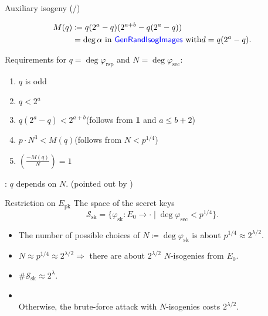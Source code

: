 \begin{frame}{Auxiliary isogeny (/\auxRIItotal{})}

    \vspace{-10pt}
    \begin{align*}
        M(q) &\coloneqq q(2^a - q)(2^{a + b} - q(2^a - q))\\
            &= \deg\alpha \text{ in \textcolor{blue}{\textsf{GenRandIsogImages}} with} d = q(2^a - q).
    \end{align*}

    \mypause
    \vspace{10pt}
    Requirements for $q = \deg\varphi_\mathrm{rsp}$ and $N = \deg\varphi_\mathrm{sec}$:
    \begin{enumerate}
        \item $q$ is odd
        \item $q < 2^a$
        \item $q(2^a - q) < 2^{a + b}$\quad (follows from \textbf{1} and $a \leq b + 2$)
        \item $p \cdot N^3 < M(q)$\qquad (follows from $N < p^{1/4}$)
        \item $\left(\frac{-M(q)}{N}\right) = 1$
    \end{enumerate}

    \vspace{10pt}
     : $q$ depends on $N$.\quad
    (pointed out by \cite{CCILV2024sqisign2d_attack})
\end{frame}

\begin{frame}{Restriction on $E_\mathrm{pk}$}
    The space of the secret keys
    $$
        \mathcal{S}_\mathrm{sk} = \{
            \varphi_\mathrm{sk}: E_0 \to \cdot
            \mid \deg\varphi_{\mathrm{sec}} < p^{1/4} \}.
    $$
    \begin{itemize}
        \setlength{\itemsep}{10pt}
        \item The number of possible choices of $N \coloneqq \deg\varphi_\mathrm{sk}$ is about $p^{1/4} \approx 2^{\lambda/2}$.
        \item $N \approx p^{1/4} \approx 2^{\lambda/2} \Rightarrow$ there are about $2^{\lambda/2}$ $N$-isogenies from $E_0$.
        \item $\#\mathcal{S}_\mathrm{sk} \approx 2^{\lambda}$.
        \item {}\\
            Otherwise, the brute-force attack with $N$-isogenies costs $2^{\lambda/2}$.
    \end{itemize}

\end{frame}

